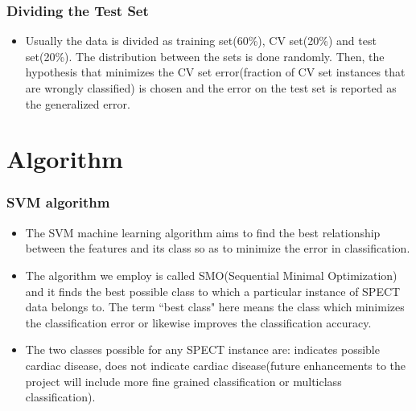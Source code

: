 \documentclass[11pt,xcolor=dvipsnames]{beamer}
\begin{document}
\begin{frame}
\frametitle{Dividing the Test Set}	
\begin{itemize}
\item Usually the data is divided as training set(60\%), CV set(20\%) and test set(20\%). The distribution between the sets is done randomly. Then, the hypothesis that minimizes the CV set error(fraction of CV set instances that are wrongly classified) is chosen and the error on the test set is reported as the generalized error.
\end{itemize}
\end{frame}


\section{Algorithm}	
\begin{frame}
\frametitle{SVM algorithm}	
\begin{itemize}
\item The SVM machine learning algorithm aims to find the best relationship between the features and its class so as to minimize the error in classification.\\ 
\item The algorithm we employ is called {\color{PineGreen}SMO(Sequential Minimal Optimization)} and it finds the best possible class to which a particular instance of SPECT data belongs to. The term ``best class" here means the class which minimizes the classification error or likewise improves the classification accuracy.\\
\item The two classes possible for any SPECT instance are: indicates possible cardiac disease, does not indicate cardiac disease(future enhancements to the project will include more fine grained classification or multiclass classification).
\end{itemize}
\end{frame}
\end{document}
